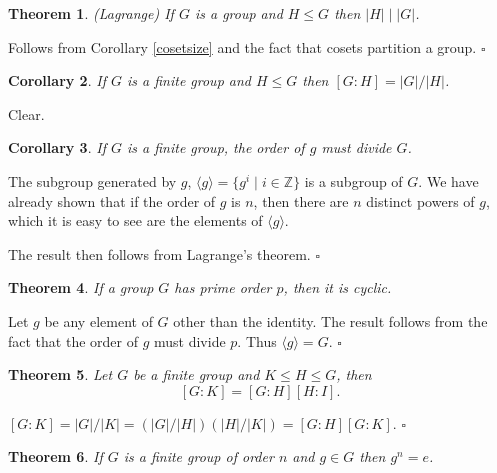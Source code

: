 \documentclass[10pt]{article}
\newcommand{\Z}{\mathbb{Z}}
\newtheorem{theorem}{Theorem}[section]
\newtheorem{corollary}[theorem]{Corollary}
\newenvironment{proof}[1][Proof]{\begin{trivlist}
\item[\hskip \labelsep {\itshape #1}]}{\end{trivlist}}
\begin{document}
\begin{theorem} (Lagrange)
If $G$ is a group and $H \leq G$ then $|H| \;|\; |G|$.
\end{theorem}

\begin{proof}
Follows from Corollary \ref{cosetsize} and the fact that cosets partition a group. $\square$
\end{proof}

\begin{corollary}
If $G$ is a finite group and $H \leq G$ then $[G:H] = |G|/|H|$.
\end{corollary}

\begin{proof}
Clear.
\end{proof}

\begin{corollary}
If $G$ is a finite group, the order of $g$ must divide $G$.
\end{corollary}

\begin{proof}
The subgroup generated by $g$, $\langle g \rangle = \{g^i \;|\; i \in \Z\}$ is a subgroup of $G$. We have already shown that if the order of $g$ is $n$, then there are $n$ distinct powers of $g$, which it is easy to see are the elements of $\langle g \rangle$.

The result then follows from Lagrange's theorem. $\square$
\end{proof}

\begin{theorem}
If a group $G$ has prime order $p$, then it is cyclic.
\end{theorem}

\begin{proof}
Let $g$ be any element of $G$ other than the identity. The result follows from the fact that the order of $g$ must divide $p$. Thus $\langle g \rangle = G$. $\square$
\end{proof}

\begin{theorem}
Let $G$ be a finite group and $K \leq H \leq G$, then
$$[G:K] = [G:H][H:I].$$
\end{theorem}

\begin{proof}
$[G:K] = |G|/|K| = (|G|/|H|)(|H|/|K|) = [G:H][G:K]$. $\square$
\end{proof}

\begin{theorem} \label{gtoorder}
If $G$ is a finite group of order $n$ and $g \in G$ then $g^n = e$.
\end{theorem}
\end{document}
